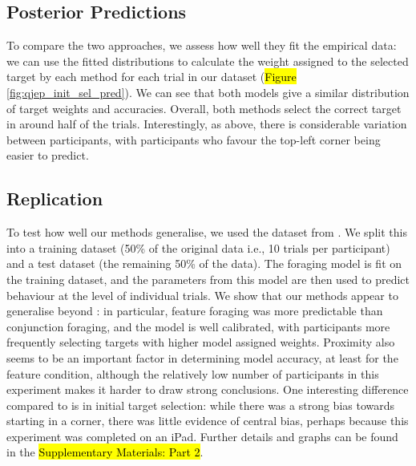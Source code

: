 \documentclass[vision,article,accept,pdftex,moreauthors]{Definitions/mdpi}
\begin{document}
\subsection{Posterior Predictions}

To compare the two approaches, we assess how well they fit the empirical data: we can use the fitted distributions to calculate the weight assigned to the selected target by each method for each trial in our dataset (\hl{Figure} \ref{fig:qjep_init_sel_pred}). We can see that both models give a similar distribution of target weights and accuracies. Overall, both methods  select the correct target in around half of the trials. Interestingly, as above, there is considerable variation between participants, with participants who favour the top-left corner being easier to predict. %



\subsection{Replication} 
To test how well our methods generalise, we used the dataset from \citep{kristjansson2014}. We split this into a training dataset (50\% of the original data i.e., 10 trials per participant) and a test dataset (the remaining 50\% of the data). The foraging model is fit on the training dataset, and the parameters from this model are then used to predict behaviour at the level of individual trials. We show that our methods appear to generalise beyond \citep{clarke2022}: in particular, feature foraging was more predictable than conjunction foraging, and the model is well calibrated, with participants more frequently selecting targets with higher model assigned weights. Proximity also seems to be an important factor in determining model accuracy, at least for the feature condition, although the relatively low number of participants in this experiment makes it harder to draw strong conclusions. One interesting difference compared to \citep{clarke2022} is in initial target selection: while there was a strong bias towards starting in a corner, there was little evidence of central bias, perhaps because this experiment was completed on an iPad. Further details and graphs can be found in the \hl{Supplementary Materials: Part 2}.
\end{document}
